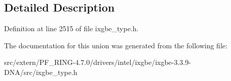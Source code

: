 \subsection{Detailed Description}


Definition at line 2515 of file ixgbe\_\-type.h.



The documentation for this union was generated from the following file:\begin{DoxyCompactItemize}
\item 
src/extern/PF\_\-RING-\/4.7.0/drivers/intel/ixgbe/ixgbe-\/3.3.9-\/DNA/src/ixgbe\_\-type.h\end{DoxyCompactItemize}
